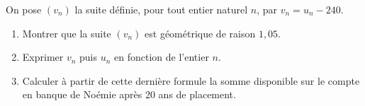\documentclass[10pt]{article}
\begin{document}
\medskip

On pose $\left(v_n\right)$ la suite définie, pour tout entier naturel $n$, par $v_n = u_n- 240$.

\begin{enumerate}[resume]
\item Montrer que la suite $\left(v_n\right)$ est géométrique de raison $1,05$.
\item Exprimer $v_n$ puis $u_n$ en fonction de l’entier $n$.
\item Calculer à partir de cette dernière formule la somme disponible sur le compte en banque de
Noémie après 20 ans de placement.
\end{enumerate}

\vspace{0,5cm}
\end{document}
